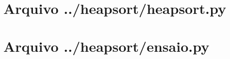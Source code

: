 \documentclass[12pt,a4paper,twoside]{report}
\begin{document}
\clearpage
\clearpage
{}
\appendix

\chapter{Arquivo ../heapsort/heapsort.py \label{ap:heapsort}}


\chapter{Arquivo ../heapsort/ensaio.py \label{ap:heapsortensaio}}

\end{document}

